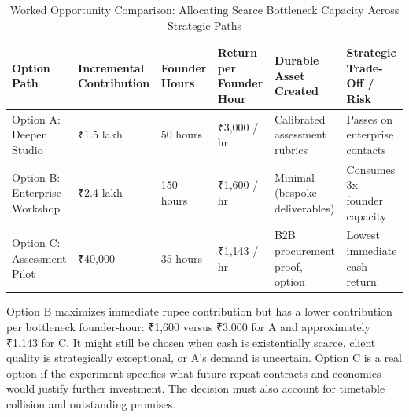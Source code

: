 \begin{table}[t]
\centering
\small
\caption{Worked Opportunity Comparison: Allocating Scarce Bottleneck Capacity Across Strategic Paths}
\label{tab:project_capacity_comparison}
\begin{tabularx}{\textwidth}{l p{2.2cm} p{2.2cm} p{2.4cm} p{2.6cm} X}
\toprule
\textbf{Option Path} & \textbf{Incremental Contribution} & \textbf{Founder Hours} & \textbf{Return per Founder Hour} & \textbf{Durable Asset Created} & \textbf{Strategic Trade-Off / Risk} \\
\midrule
Option A: Deepen Studio & ₹1.5 lakh & 50 hours & ₹3,000 / hr & Calibrated assessment rubrics & Passes on enterprise contacts \\
\addlinespace[2pt]
Option B: Enterprise Workshop & ₹2.4 lakh & 150 hours & ₹1,600 / hr & Minimal (bespoke deliverables) & Consumes 3x founder capacity \\
\addlinespace[2pt]
Option C: Assessment Pilot & ₹40,000 & 35 hours & ₹1,143 / hr & B2B procurement proof, option & Lowest immediate cash return \\
\bottomrule
\end{tabularx}
\end{table}

Option B maximizes immediate rupee contribution but has a lower contribution per bottleneck founder-hour: ₹1,600 versus ₹3,000 for A and approximately ₹1,143 for C. It might still be chosen when cash is existentially scarce, client quality is strategically exceptional, or A's demand is uncertain. Option C is a real option if the experiment specifies what future repeat contracts and economics would justify further investment. The decision must also account for timetable collision and outstanding promises.
